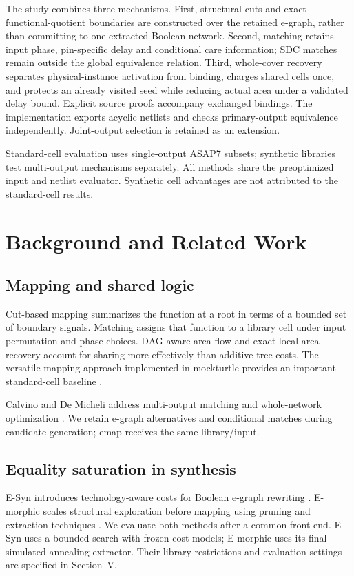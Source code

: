 \documentclass[conference]{IEEEtran}
\begin{document}
The study combines three mechanisms. First, structural cuts and exact
functional-quotient boundaries are constructed over the retained e-graph,
rather than committing to one extracted Boolean network. Second, matching
retains input phase, pin-specific delay and conditional care information;
SDC matches remain outside the global equivalence relation. Third,
whole-cover recovery separates physical-instance activation from binding,
charges shared cells once, and protects an already visited seed while
reducing actual area under a validated delay bound. Explicit source
proofs accompany exchanged bindings. The implementation exports acyclic
netlists and checks primary-output equivalence independently. Joint-output
selection is retained as an extension.


Standard-cell evaluation uses single-output ASAP7 subsets; synthetic
libraries test multi-output mechanisms separately. All methods share the
preoptimized input and netlist evaluator. Synthetic cell advantages are
not attributed to the standard-cell results.

\section{Background and Related Work}
\subsection{Mapping and shared logic}
Cut-based mapping summarizes the function at a root in terms of a bounded
set of boundary signals. Matching assigns that function to a library cell
under input permutation and phase choices. DAG-aware area-flow and exact
local area recovery account for sharing more effectively than additive
tree costs. The versatile mapping approach implemented in mockturtle
provides an important standard-cell baseline \cite{versatile}.

Calvino and De Micheli address multi-output matching and whole-network
optimization \cite{emap}. We retain e-graph alternatives and conditional
matches during candidate generation; emap receives the same library/input.

\subsection{Equality saturation in synthesis}
E-Syn introduces technology-aware costs for Boolean e-graph rewriting
\cite{esyn}. E-morphic scales structural exploration before mapping using
pruning and extraction techniques \cite{emorphic}. We evaluate both methods after a common front end. E-Syn uses a bounded
search with frozen cost models; E-morphic uses its final simulated-annealing
extractor. Their library restrictions and evaluation settings are specified
in Section~V.
\end{document}
